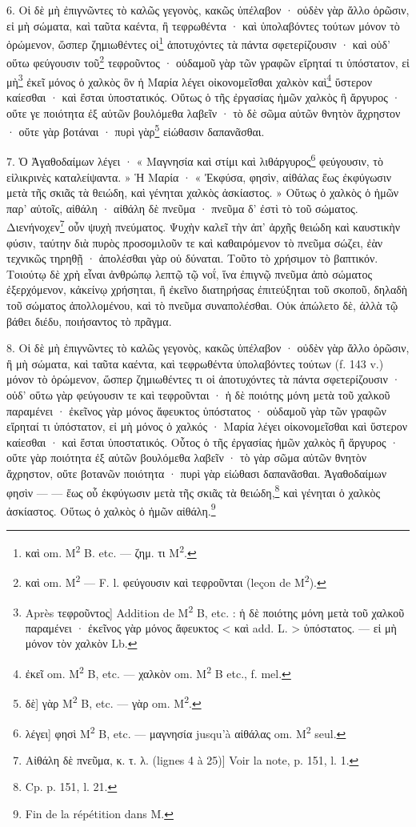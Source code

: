 \documentclass[landscape, a4paper, 11pt, oneside, polutonikogreek, french]{article}
\begin{document}
6. Οἱ δὲ μὴ ἐπιγνῶντες τὸ καλῶς γεγονὸς, κακῶς ὑπέλαβον · οὐδὲν γὰρ ἄλλο ὁρῶσιν, εἰ μὴ σώματα, καὶ ταῦτα καέντα, ἢ τεφρωθέντα · καὶ ὑπολαβόντες τούτων μόνον τὸ ὁρώμενον, ὥσπερ ζημιωθέντες οἱ\footnote{καὶ om. M\textsuperscript{2} B. etc. --- ζημ. τι M\textsuperscript{2}.} ἀποτυχόντες τὰ πάντα σφετερίζουσιν · καὶ οὐδ' οὕτω φεύγουσιν τοῦ\footnote{καὶ om. M\textsuperscript{2} --- F. l. φεύγουσιν καὶ τεφροῦνται (leçon de M\textsuperscript{2}).} τεφροῦντος · οὐδαμοῦ γὰρ τῶν γραφῶν εἴρηταί τι ὑπόστατον, εἰ μὴ\footnote{Après τεφροῦντος] Addition de M\textsuperscript{2} B, etc. : ἡ δὲ ποιότης μόνη μετὰ τοῦ χαλκοῦ παραμένει · ἐκεῖνος γὰρ μόνος ἄφευκτος < καὶ add. L. > ὑπόστατος. --- εἰ μὴ μόνον τὸν χαλκὸν Lb.} ἐκεῖ μόνος ὁ χαλκὸς ὃν ἡ Μαρία λέγει οἰκονομεῖσθαι χαλκὸν καὶ\footnote{ἐκεῖ om. M\textsuperscript{2} B, etc. --- χαλκὸν om. M\textsuperscript{2} B etc., f. mel.} ὕστερον καίεσθαι · καὶ ἔσται ὑποστατικός. Οὕτως ὁ τῆς ἐργασίας ἡμῶν χαλκὸς ἢ ἄργυρος · οὔτε γε ποιότητα ἐξ αὐτῶν βουλόμεθα λαβεῖν · τὸ δὲ σῶμα αὐτῶν θνητὸν ἄχρηστον · οὔτε γὰρ βοτάναι · πυρὶ γὰρ\footnote{δὲ] γὰρ M\textsuperscript{2} B, etc. ---  γὰρ om. M\textsuperscript{2}.} εἰώθασιν δαπανᾶσθαι.

7. Ὁ Ἀγαθοδαίμων λέγει · « Μαγνησία καὶ στίμι καὶ λιθάργυρος\footnote{λέγει] φησὶ M\textsuperscript{2} B, etc. --- μαγνησία jusqu'à αἰθάλας om. M\textsuperscript{2} seul.} φεύγουσιν, τὸ εἰλικρινὲς καταλείψαντα. » Ἡ Μαρία · « Ἐκφύσα, φησὶν, αἰθάλας ἕως ἐκφύγωσιν μετὰ τῆς σκιᾶς τὰ θειώδη, καὶ γένηται χαλκὸς ἀσκίαστος. » Οὕτως ὁ χαλκὸς ὁ ἡμῶν παρ' αὐτοῖς, αἰθάλη · αἰθάλη δὲ πνεῦμα · πνεῦμα δ' ἐστὶ τὸ τοῦ σώματος. Διενήνοχεν\footnote{Αἰθάλη δὲ πνεῦμα, κ. τ. λ. (lignes 4 à 25)] Voir la note, p. 151, l. 1.} οὖν ψυχὴ πνεύματος. Ψυχὴν καλεῖ τὴν ἀπ' ἀρχῆς θειώδη καὶ καυστικὴν φύσιν, ταύτην διὰ πυρὸς προσομιλοῦν τε καὶ καθαιρόμενον τὸ πνεῦμα σώζει, ἐὰν τεχνικῶς τηρηθῇ · ἀπολέσθαι γὰρ οὐ δύναται. Τοῦτο τὸ χρήσιμον τὸ βαπτικόν. Τοιούτῳ δὲ χρὴ εἶναι ἀνθρώπῳ λεπτῷ τῷ νοΐ, ἵνα ἐπιγνῷ πνεῦμα ἀπὸ σώματος ἐξερχόμενον, κἀκείνῳ χρήσηται, ἢ ἐκεῖνο διατηρήσας ἐπιτεύξηται τοῦ σκοποῦ, δηλαδὴ τοῦ σώματος ἀπολλομένου, καὶ τὸ πνεῦμα συναπολέσθαι. Οὐκ ἀπώλετο δὲ, ἀλλὰ τῷ βάθει διέδυ, ποιήσαντος τὸ πρᾶγμα.

 

8. Οἱ δὲ μὴ ἐπιγνῶντες τὸ καλῶς γεγονὸς, κακῶς ὑπέλαβον · οὐδὲν γὰρ ἄλλο ὀρῶσιν, ἢ μὴ σώματα, καὶ ταῦτα καέντα, καὶ τεφρωθέντα ὑπολαβόντες τούτων (f. 143 v.) μόνον τὸ ὁρώμενον, ὥσπερ ζημιωθέντες τι οἱ ἀποτυχόντες τὰ πάντα σφετερίζουσιν · οὐδ' οὕτω γὰρ φεύγουσιν τε καὶ τεφροῦνται · ἡ δὲ ποιότης μόνη μετὰ τοῦ χαλκοῦ παραμένει · ἐκεῖνος γὰρ μόνος ἄφευκτος ὑπόστατος · οὐδαμοῦ γὰρ τῶν γραφῶν εἴρηταί τι ὑπόστατον, εἰ μὴ μόνος ὁ χαλκός · Μαρία λέγει οἰκονομεῖσθαι καὶ ὕστερον καίεσθαι · καὶ ἔσται ὑποστατικός. Οὗτος ὁ τῆς ἐργασίας ἡμῶν χαλκὸς ἢ ἄργυρος · οὔτε γὰρ ποιότητα ἐξ αὐτῶν βουλόμεθα λαβεῖν · τὸ γὰρ σῶμα αὐτῶν θνητὸν ἄχρηστον, οὔτε βοτανῶν ποιότητα · πυρὶ γὰρ εἰώθασι δαπανᾶσθαι. Ἀγαθοδαίμων φησὶν --- --- ἕως οὗ ἐκφύγωσιν μετὰ τῆς σκιᾶς τὰ θειώδη,\footnote{Cp. p. 151, l. 21.} καὶ γένηται ὁ χαλκὸς ἀσκίαστος. Οὕτως ὁ χαλκὸς ὁ ἡμῶν αἰθάλη.\footnote{Fin de la répétition dans M.}
\end{document}
